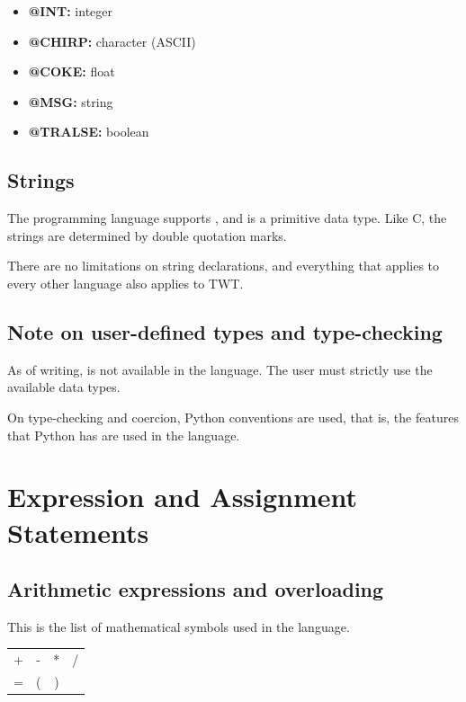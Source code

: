 \documentclass[11pt,a4paper]{report}
\begin{document}
\begin{itemize}
  \item \textbf{@INT:} integer
  \item \textbf{@CHIRP:} character (ASCII)
  \item \textbf{@COKE:} float
  \item \textbf{@MSG:} string
  \item \textbf{@TRALSE:} boolean
\end{itemize}

\section{Strings}

The programming language supports , and is a primitive data
type.
Like C, the strings are determined by double quotation marks.\par

There are no limitations on string declarations, and everything that applies to
every other language also applies to TWT.

\section{Note on user-defined types and type-checking}

As of writing,  is not available in the language.
The user must strictly use the available data types.\par

On type-checking and coercion, Python conventions are used, that is, the
features that Python has are used in the language.

\chapter{Expression and Assignment Statements}

\section{Arithmetic expressions and overloading}

This is the list of mathematical symbols used in the
language.

\begin{center}
\begin{tabular}{ c c c c }
 + & - & * & / \\
 = & ( & )
\end{tabular}
\end{center}
\end{document}
